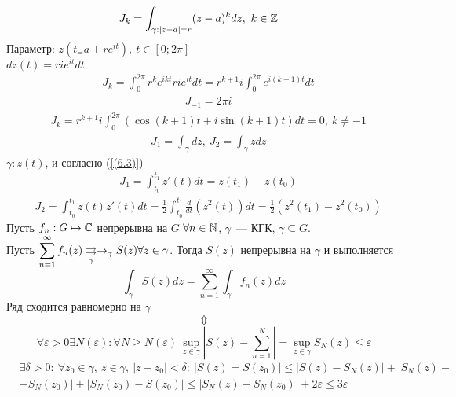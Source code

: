 \example
\begin{align*}
  &J_k = \int_{\gamma: \left| z-a \right| = r} (z-a)^k dz, \ k \in \mathbb{Z}
\end{align*}
Параметр: $z(t_ = a+re^{it}), \ t \in [0;2\pi]$
\\
$dz(t) = rie^{it}dt$
\begin{align*}
  &J_k = \int_{0}^{2\pi} r^ke^{ikt}rie^{it}dt = r^{k+1}i\int_{0}^{2\pi}e^{i(k+1)t} dt
\end{align*}
\begin{align*}
  &J_{-1} = 2 \pi i
\end{align*}
\begin{align*}
  &J_k = r^{k+1}i\int_{0}^{2\pi} \left( \cos(k+1)t + i \sin(k+1)t \right) dt = 0, \ k \neq -1
\end{align*}
\example
\begin{align*}
  &J_1 = \int_{\gamma} dz, \ J_2 = \int_{\gamma}z dz
\end{align*}
$\gamma: z(t)$, и согласно (\ref{(6.3)})
\begin{align*}
  &J_1 = \int_{t_0}^{t_1} z'(t)dt = z(t_1) - z(t_0)
\end{align*}
\begin{align*}
  &J_2 = \int_{t_0}^{t_1} z(t)z'(t)dt = \frac{1}{2}\int_{t_0}^{t_1}\frac{d}{dt}\left( z^2(t) \right)dt = \frac{1}{2}\left( z^2(t_1) - z^2(t_0) \right)
\end{align*}
\theorem
Пусть $f_n: G \mapsto \mathbb{C}$ непрерывна на $G$ $\forall n \in \mathbb{N}$, $\gamma$~---
КГК, $\gamma \subseteq G$.
\\
Пусть $\displaystyle \sum_{n=1}^{\infty}f_n(z) \underset{\gamma}{\rightrightarrows} \rightarrow_{\gamma} S(z)
\forall z \in \gamma$.
Тогда $S(z)$ непрерывна на $\gamma$ и выполняется
\begin{equation} \label{(6.7)}
  \int_{\gamma}S(z) dz = \sum_{n=1}^{\infty}\int_{\gamma}f_n(z)dz
\end{equation}
\pr
Ряд сходится равномерно на $\gamma$
\\
$$\Updownarrow$$
\begin{equation} \label{(6.8)}
  \forall \varepsilon > 0 \exists N(\varepsilon): \forall N\geq N(\varepsilon) \ \underset{z \in \gamma}{\sup} \left| S(z) - \sum_{n = 1}^{N} \right| = \underset{z \in \gamma}{\sup} S_N(z) \leq \varepsilon
\end{equation}
\begin{align*}
  &\exists \delta > 0: \ \forall z_0 \in \gamma, \ z \in \gamma, \ \left| z - z_0 \right| < \delta: \ \left| S(z) = S(z_0) \right| \leq \left| S(z) - S_N(z) \right| +  \left| S_N(z) - \right. \\
  &\left. - S_N(z_0) \right| + \left| S_N(z_0) - S(z_0) \right| \leq \left| S_N(z) - S_N(z_0) \right| + 2 \varepsilon \leq 3 \varepsilon
\end{align*}
